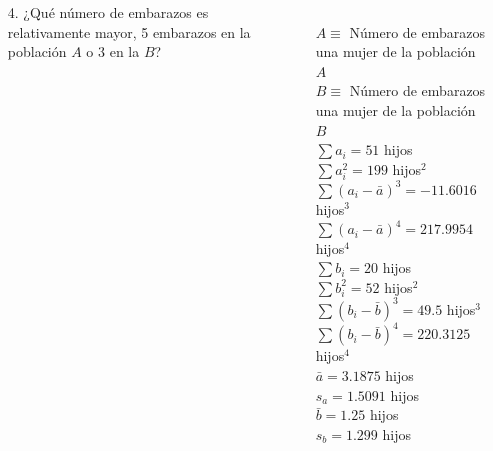 \documentclass[aspectratio=149,10pt,t]{beamer}
\begin{document}
\begin{frame}
	\begin{columns}
		\begin{column}[T]{0.65\textwidth}
			\begin{enumerate}
			  \item[4.] ¿Qué número de embarazos es relativamente mayor, 5 embarazos en la población $A$ o 3 en la $B$?
			\end{enumerate}
		\end{column}
		\begin{column}[T]{0.35\textwidth}
			\\
			$A\equiv$ Número de embarazos una mujer de la población $A$\\
			$B\equiv$ Número de embarazos una mujer de la población $B$\\
			$\sum a_i=51$ hijos\\
			$\sum a_i^2=199$ hijos$^2$\\
			$\sum (a_i-\bar a)^3=-11.6016$ hijos$^3$\\
			$\sum (a_i-\bar a)^4=217.9954$ hijos$^4$\\
			$\sum b_i=20$ hijos\\
			$\sum b_i^2=52$ hijos$^2$\\
			$\sum (b_i-\bar b)^3=49.5$ hijos$^3$\\
			$\sum (b_i-\bar b)^4=220.3125$ hijos$^4$\\
			$\bar a=3.1875$ hijos\\
			$s_a = 1.5091$ hijos\\
			$\bar b=1.25$ hijos\\
			$s_b = 1.299$ hijos
			\end{column}
	\end{columns}
\end{frame}
\end{document}
